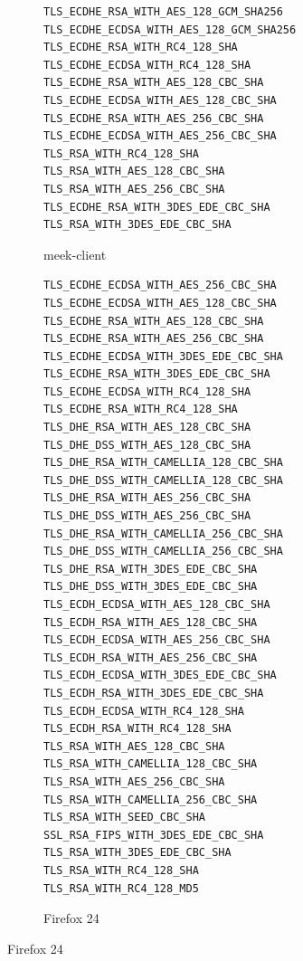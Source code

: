 \documentclass[conference]{IEEEtran}
\begin{document}
\begin{figure}

\begin{subfigure}[t]{0.30\textwidth}
\begin{minipage}[t][17ex][t]{0.30\textwidth}
\tiny
\begin{verbatim}
TLS_ECDHE_RSA_WITH_AES_128_GCM_SHA256
TLS_ECDHE_ECDSA_WITH_AES_128_GCM_SHA256
TLS_ECDHE_RSA_WITH_RC4_128_SHA
TLS_ECDHE_ECDSA_WITH_RC4_128_SHA
TLS_ECDHE_RSA_WITH_AES_128_CBC_SHA
TLS_ECDHE_ECDSA_WITH_AES_128_CBC_SHA
TLS_ECDHE_RSA_WITH_AES_256_CBC_SHA
TLS_ECDHE_ECDSA_WITH_AES_256_CBC_SHA
TLS_RSA_WITH_RC4_128_SHA
TLS_RSA_WITH_AES_128_CBC_SHA
TLS_RSA_WITH_AES_256_CBC_SHA
TLS_ECDHE_RSA_WITH_3DES_EDE_CBC_SHA
TLS_RSA_WITH_3DES_EDE_CBC_SHA
\end{verbatim}
\end{minipage}
\caption{meek-client}
\label{fig:ciphersuites:meek-client}
\end{subfigure}
%
\begin{subfigure}[t]{0.30\textwidth}
\begin{minipage}[t][48ex][t]{0.30\textwidth}
\tiny
\begin{verbatim}
TLS_ECDHE_ECDSA_WITH_AES_256_CBC_SHA
TLS_ECDHE_ECDSA_WITH_AES_128_CBC_SHA
TLS_ECDHE_RSA_WITH_AES_128_CBC_SHA
TLS_ECDHE_RSA_WITH_AES_256_CBC_SHA
TLS_ECDHE_ECDSA_WITH_3DES_EDE_CBC_SHA
TLS_ECDHE_RSA_WITH_3DES_EDE_CBC_SHA
TLS_ECDHE_ECDSA_WITH_RC4_128_SHA
TLS_ECDHE_RSA_WITH_RC4_128_SHA
TLS_DHE_RSA_WITH_AES_128_CBC_SHA
TLS_DHE_DSS_WITH_AES_128_CBC_SHA
TLS_DHE_RSA_WITH_CAMELLIA_128_CBC_SHA
TLS_DHE_DSS_WITH_CAMELLIA_128_CBC_SHA
TLS_DHE_RSA_WITH_AES_256_CBC_SHA
TLS_DHE_DSS_WITH_AES_256_CBC_SHA
TLS_DHE_RSA_WITH_CAMELLIA_256_CBC_SHA
TLS_DHE_DSS_WITH_CAMELLIA_256_CBC_SHA
TLS_DHE_RSA_WITH_3DES_EDE_CBC_SHA
TLS_DHE_DSS_WITH_3DES_EDE_CBC_SHA
TLS_ECDH_ECDSA_WITH_AES_128_CBC_SHA
TLS_ECDH_RSA_WITH_AES_128_CBC_SHA
TLS_ECDH_ECDSA_WITH_AES_256_CBC_SHA
TLS_ECDH_RSA_WITH_AES_256_CBC_SHA
TLS_ECDH_ECDSA_WITH_3DES_EDE_CBC_SHA
TLS_ECDH_RSA_WITH_3DES_EDE_CBC_SHA
TLS_ECDH_ECDSA_WITH_RC4_128_SHA
TLS_ECDH_RSA_WITH_RC4_128_SHA
TLS_RSA_WITH_AES_128_CBC_SHA
TLS_RSA_WITH_CAMELLIA_128_CBC_SHA
TLS_RSA_WITH_AES_256_CBC_SHA
TLS_RSA_WITH_CAMELLIA_256_CBC_SHA
TLS_RSA_WITH_SEED_CBC_SHA
SSL_RSA_FIPS_WITH_3DES_EDE_CBC_SHA
TLS_RSA_WITH_3DES_EDE_CBC_SHA
TLS_RSA_WITH_RC4_128_SHA
TLS_RSA_WITH_RC4_128_MD5
\end{verbatim}
\end{minipage}
\caption{Firefox 24}
\label{fig:ciphersuites:firefox}
\end{subfigure}

\end{figure}
\end{document}
